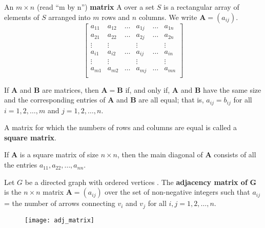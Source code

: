 \documentclass{article}
\begin{document}
\begin{description}
	\item[Matrix]An $m\times n$ (read ``m by n'') \textbf{matrix} A over a set $S$ is a rectangular array of elements of $S$ arranged into $m$ rows and $n$ columns. We write $\mathbf{A}=(a_{ij})$.
	\[
	\begin{bmatrix}
		a_{11} & a_{12} & \dots & a_{1j} & \dots & a_{1n} \\
		a_{21} & a_{22} & \dots & a_{2j} & \dots & a_{2n} \\
		\vdots & \vdots &   \   & \vdots &   \   & \vdots \\
		a_{i1} & a_{i2} & \dots & a_{ij} & \dots & a_{in} \\
		\vdots & \vdots &   \   & \vdots &   \   & \vdots \\
		a_{m1} & a_{m2} & \dots & a_{mj} & \dots & a_{mn} \\
	\end{bmatrix}
	\]
	\item \qquad If \textbf{A} and \textbf{B} are matrices, then $\mathbf{A} = \mathbf{B}$ if, and only if, \textbf{A} and \textbf{B} have the same size and the corresponding entries of \textbf{A} and \textbf{B} are all equal; that is, $a_{ij}=b_{ij}$ for all $i=1,2,\dots,m$ and $j=1,2,\dots,n$.
	\item \qquad A matrix for which the numbers of rows and columns are equal is called a \textbf{square matrix}.
	\item \qquad If \textbf{A} is a square matrix of size $n\times n$, then the main diagonal of \textbf{A} consists of all the entries $a_{11},a_{22},\dots,a_{nn}$.
	
    \item[Adjacency Matrix of a Directed Graph] Let $G$ be a directed graph with ordered vertices . The \textbf{adjacency matrix of} $\mathbf{G}$ is the $n\times n$ matrix $\mathbf{A}=(a_{ij})$ over the set of non-negative integers such that $a_{ij}$ = the number of arrows connecting $v_{i}$ and $v_{j}$ for all $i, j = 1, 2, \dots, n$.
    
		\begin{figure}[H]
			\centering
			\texttt{[image: adj\_matrix]}
		\end{figure}
    

\end{description}
\end{document}
